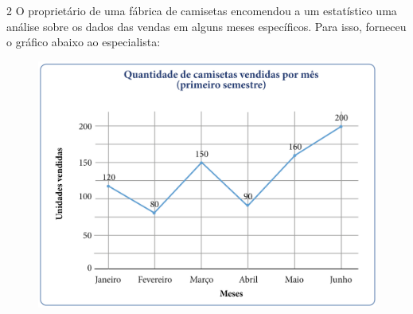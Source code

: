 
\pagebreak
\num{2} O proprietário de uma fábrica de camisetas encomendou a um
estatístico uma análise sobre os dados das vendas em alguns
meses específicos. Para isso, forneceu o gráfico abaixo ao especialista:

\begin{figure}[htpb!]
\includegraphics[width=\textwidth]{../ilustracoes/MAT5/SAEB_5ANO_MAT_figura101.png}
\end{figure}

